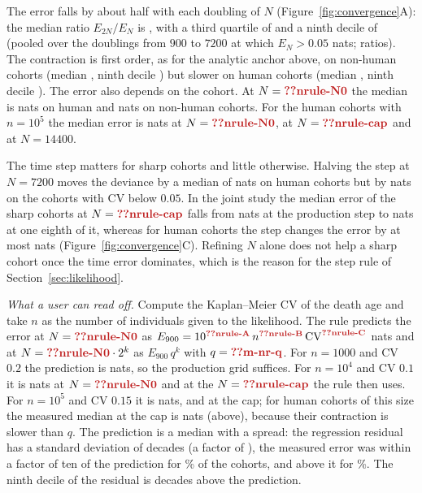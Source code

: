 The error falls by about half with each doubling of $N$ (Figure~\ref{fig:convergence}A): the median ratio $E_{2N}/E_N$ is
, with a third quartile of  and a ninth decile of  (pooled over the doublings
from $900$ to $7200$ at which $E_N>0.05$ nats;  ratios). The contraction is first order, as for the analytic
anchor above, on non-human cohorts (median , ninth decile ) but slower on human
cohorts (median , ninth decile ). The error also depends on the cohort. At $N=\C{nrule-N0}$ the
median is  nats on human and  nats on non-human cohorts. For the
 human cohorts with $n=10^{5}$ the median error is  nats at $N=\C{nrule-N0}$,  at
$N=\C{nrule-cap}$ and  at $N=14400$.

The time step matters for sharp cohorts and little otherwise. Halving the step at $N=7200$ moves the deviance by a median of
 nats on human cohorts but by  nats on the  cohorts with CV below $0.05$. In the joint
study the median error of the sharp cohorts at $N=\C{nrule-cap}$ falls from  nats at the production step to  nats
at one eighth of it, whereas for human cohorts the step changes the error by at most  nats
(Figure~\ref{fig:convergence}C). Refining $N$ alone does not help a sharp cohort once the time error dominates, which is the reason for
the step rule of Section~\ref{sec:likelihood}.

\emph{What a user can read off.} Compute the Kaplan--Meier CV of the death age and take $n$ as the number of individuals
given to the likelihood. The rule predicts the error at $N=\C{nrule-N0}$ as
$E_{900}=10^{\C{nrule-A}}\,n^{\C{nrule-B}}\,\mathrm{CV}^{\C{nrule-C}}$ nats and at $N=\C{nrule-N0}\cdot2^{k}$ as
$E_{900}\,q^{k}$ with $q=\C{m-nr-q}$. For $n=1000$ and CV $0.2$ the prediction is  nats, so the production grid
suffices. For $n=10^{4}$ and CV $0.1$ it is  nats at $N=\C{nrule-N0}$ and  at the
$N=\C{nrule-cap}$ the rule then uses. For $n=10^{5}$ and CV $0.15$ it is  nats, and  at the cap; for human
cohorts of this size the measured median at the cap is  nats (above), because their contraction is slower than $q$. The
prediction is a median with a spread: the regression residual has a standard deviation of  decades
(a factor of ), the measured error was within a factor of ten of the prediction for \% of the
cohorts, and above it for \%. The ninth decile of the residual is  decades above the prediction.

